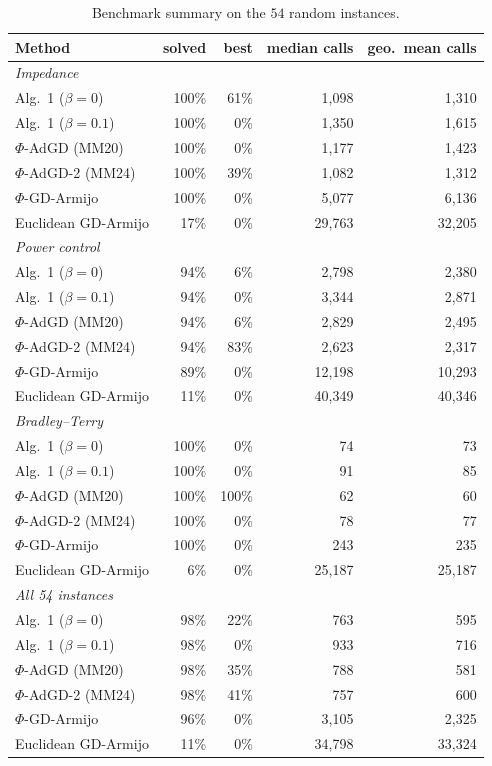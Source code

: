 \begin{table}[H]
\centering
\caption{Benchmark summary on the $54$ random instances.}
\label{tab:profiles}
\small
\begin{tabular}{@{}lrrrr@{}}
\toprule
Method & solved & best & median calls & geo.\ mean calls\\
\midrule
\multicolumn{5}{l}{\emph{Impedance}}\\
\quad Alg.~1 ($\beta=0$) & 100\% & 61\% & 1{,}098 & 1{,}310\\
\quad Alg.~1 ($\beta=0.1$) & 100\% & 0\% & 1{,}350 & 1{,}615\\
\quad $\Phi$-AdGD (MM20) & 100\% & 0\% & 1{,}177 & 1{,}423\\
\quad $\Phi$-AdGD-2 (MM24) & 100\% & 39\% & 1{,}082 & 1{,}312\\
\quad $\Phi$-GD-Armijo & 100\% & 0\% & 5{,}077 & 6{,}136\\
\quad Euclidean GD-Armijo & 17\% & 0\% & 29{,}763 & 32{,}205\\
\midrule
\multicolumn{5}{l}{\emph{Power control}}\\
\quad Alg.~1 ($\beta=0$) & 94\% & 6\% & 2{,}798 & 2{,}380\\
\quad Alg.~1 ($\beta=0.1$) & 94\% & 0\% & 3{,}344 & 2{,}871\\
\quad $\Phi$-AdGD (MM20) & 94\% & 6\% & 2{,}829 & 2{,}495\\
\quad $\Phi$-AdGD-2 (MM24) & 94\% & 83\% & 2{,}623 & 2{,}317\\
\quad $\Phi$-GD-Armijo & 89\% & 0\% & 12{,}198 & 10{,}293\\
\quad Euclidean GD-Armijo & 11\% & 0\% & 40{,}349 & 40{,}346\\
\midrule
\multicolumn{5}{l}{\emph{Bradley--Terry}}\\
\quad Alg.~1 ($\beta=0$) & 100\% & 0\% & 74 & 73\\
\quad Alg.~1 ($\beta=0.1$) & 100\% & 0\% & 91 & 85\\
\quad $\Phi$-AdGD (MM20) & 100\% & 100\% & 62 & 60\\
\quad $\Phi$-AdGD-2 (MM24) & 100\% & 0\% & 78 & 77\\
\quad $\Phi$-GD-Armijo & 100\% & 0\% & 243 & 235\\
\quad Euclidean GD-Armijo & 6\% & 0\% & 25{,}187 & 25{,}187\\
\midrule
\multicolumn{5}{l}{\emph{All 54 instances}}\\
\quad Alg.~1 ($\beta=0$) & 98\% & 22\% & 763 & 595\\
\quad Alg.~1 ($\beta=0.1$) & 98\% & 0\% & 933 & 716\\
\quad $\Phi$-AdGD (MM20) & 98\% & 35\% & 788 & 581\\
\quad $\Phi$-AdGD-2 (MM24) & 98\% & 41\% & 757 & 600\\
\quad $\Phi$-GD-Armijo & 96\% & 0\% & 3{,}105 & 2{,}325\\
\quad Euclidean GD-Armijo & 11\% & 0\% & 34{,}798 & 33{,}324\\
\bottomrule
\end{tabular}
\end{table}
